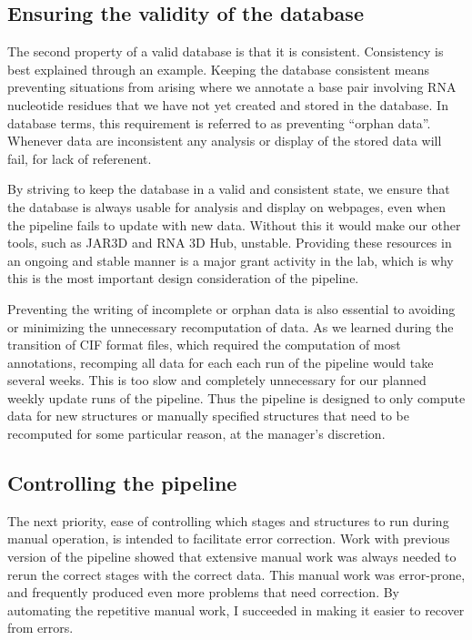 \subsection{Ensuring the validity of the database}

The second property of a valid database is that it is consistent. Consistency is
best explained through an example. Keeping the database consistent means
preventing situations from arising where we annotate a base pair involving RNA
nucleotide residues that we have not yet created and stored in the database. In
database terms, this requirement is referred to as preventing ``orphan data''.
Whenever data are inconsistent any analysis or display of the stored data will
fail, for lack of referenent.

By striving to keep the database in a valid and consistent state, we ensure that
the database is always usable for analysis and display on webpages, even when
the pipeline fails to update with new data. Without this it would make our other
tools, such as JAR3D and RNA 3D Hub, unstable. Providing these resources in an
ongoing and stable manner is a major grant activity in the lab, which is why
this is the most important design consideration of the pipeline.

Preventing the writing of incomplete or orphan data is also essential to
avoiding or minimizing the unnecessary recomputation of data. As we learned
during the transition of CIF format files, which required the computation of
most annotations, recomping all data for each each run of the pipeline would
take several weeks. This is too slow and completely unnecessary for our planned
weekly update runs of the pipeline. Thus the pipeline is designed to only
compute data for new structures or manually specified structures that need to be
recomputed for some particular reason, at the manager's discretion.

\subsection{Controlling the pipeline}

The next priority, ease of controlling which stages and structures to run during
manual operation, is intended to facilitate error correction. Work with previous
version of the pipeline showed that extensive manual work was always needed to
rerun the correct stages with the correct data. This manual work was
error-prone, and frequently produced even more problems that need correction. By
automating the repetitive manual work, I succeeded in making it easier to
recover from errors.

